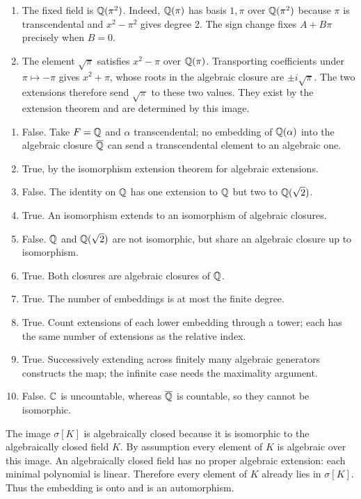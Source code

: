 \begin{enumerate}[label=(\alph*)]
\item The fixed field is $\mathbb{Q}(\pi^2)$. Indeed, $\mathbb{Q}(\pi)$ has basis $1,\pi$ over $\mathbb{Q}(\pi^2)$ because $\pi$ is transcendental and $x^2-\pi^2$ gives degree 2. The sign change fixes $A+B\pi$ precisely when $B=0$.
\item The element $\sqrt\pi$ satisfies $x^2-\pi$ over $\mathbb{Q}(\pi)$. Transporting coefficients under $\pi\mapsto-\pi$ gives $x^2+\pi$, whose roots in the algebraic closure are $\pm i\sqrt\pi$. The two extensions therefore send $\sqrt\pi$ to these two values. They exist by the extension theorem and are determined by this image.
\end{enumerate}

\begin{enumerate}[label=(\alph*)]
\item False. Take $F=\mathbb{Q}$ and $\alpha$ transcendental; no embedding of $\mathbb{Q}(\alpha)$ into the algebraic closure $\overline{\mathbb{Q}}$ can send a transcendental element to an algebraic one.
\item True, by the isomorphism extension theorem for algebraic extensions.
\item False. The identity on $\mathbb{Q}$ has one extension to $\mathbb{Q}$ but two to $\mathbb{Q}(\sqrt2)$.
\item True. An isomorphism extends to an isomorphism of algebraic closures.
\item False. $\mathbb{Q}$ and $\mathbb{Q}(\sqrt2)$ are not isomorphic, but share an algebraic closure up to isomorphism.
\item True. Both closures are algebraic closures of $\mathbb{Q}$.
\item True. The number of embeddings is at most the finite degree.
\item True. Count extensions of each lower embedding through a tower; each has the same number of extensions as the relative index.
\item True. Successively extending across finitely many algebraic generators constructs the map; the infinite case needs the maximality argument.
\item False. $\mathbb{C}$ is uncountable, whereas $\overline{\mathbb{Q}}$ is countable, so they cannot be isomorphic.
\end{enumerate}

The image $\sigma[K]$ is algebraically closed because it is isomorphic to the algebraically closed field $K$. By assumption every element of $K$ is algebraic over this image. An algebraically closed field has no proper algebraic extension: each minimal polynomial is linear. Therefore every element of $K$ already lies in $\sigma[K]$. Thus the embedding is onto and is an automorphism.

